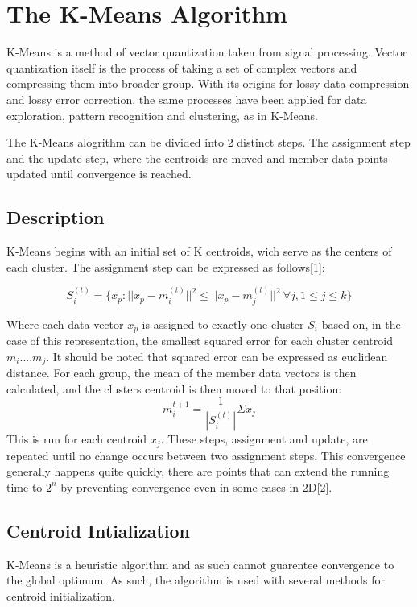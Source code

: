 \documentclass[journal]{IEEEtran}
\begin{document}
\section{The K-Means Algorithm}
K-Means is a method of vector quantization taken from signal processing. Vector quantization itself is the process of taking a set of complex vectors and compressing them into broader group. With its origins for lossy data compression and lossy error correction, the same processes have been applied for data exploration, pattern recognition and clustering, as in K-Means.

The K-Means alogrithm can be divided into 2 distinct steps. The assignment step and the update step, where the centroids are moved and member data points updated until convergence is reached.



\subsection{Description}
K-Means begins with an initial set of K centroids, wich serve as the centers of each cluster. The assignment step can be expressed as follows[1]:

$$ S_{i}^{(t)} = \{x_{p}: ||x_{p} -m_{i}^{(t)}||^{2 } \leq  ||x_{p} -m_{j}^{(t)}||^{2 } \ \forall j, 1 \leq j \leq k\} $$


Where each data vector $ x_{p} $ is assigned to exactly one cluster $S_{i}$ based on, in the case of this representation, the smallest squared error for each cluster centroid $m_{i} ....m_{j}$. It should be noted that squared error can be expressed as euclidean distance. For each group, the mean of the member data vectors is then calculated, and the clusters centroid is then moved to that position:
$$m_{i}^{t+1} = \frac{1}{|S_{i}^{(t)}|}\Sigma x_{j}$$
This is run for each centroid $x_{j}$. These steps, assignment and update, are repeated until no change occurs between two assignment steps. This convergence generally happens quite quickly, there are points that can extend the running time to $2^{n}$ by preventing convergence even in some cases in 2D[2].

\subsection{Centroid Intialization }
K-Means is a heuristic algorithm and as such cannot guarentee convergence to the global optimum. As such, the algorithm is used with several methods for centroid initialization.
\end{document}
